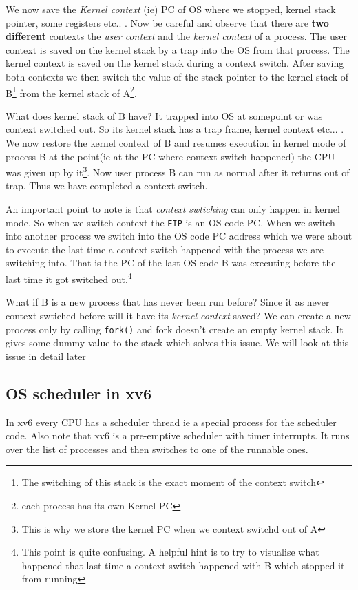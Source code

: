 \documentclass[12pt]{article}
\begin{document}
 We now save the \textit{Kernel context} (ie) PC of OS where we stopped, kernel stack pointer, some registers etc.. . Now be careful and observe that there are \textbf{two different} contexts the \textit{user context} and the \textit{kernel context} of a process.
 The user context is saved on the kernel stack by a trap into the OS from that process. The kernel context is saved on the kernel stack during a context switch.
 After saving both contexts we then switch the value of the stack pointer to the kernel stack of B\footnote{The switching of this stack is the exact moment of the context switch} from the kernel stack of A\footnote{each process has its own Kernel PC}. 

 What does kernel stack of B have? It trapped into OS at somepoint or was context switched out. So its kernel stack has a trap frame, kernel context etc... . We now restore the kernel context
 of B and resumes execution in kernel mode of process B at the point(ie at the PC where context switch happened) the CPU was given up by it\footnote{This is why we store the kernel PC when we context switchd out of A}. Now user process B can run as normal after it returns out of trap.
 Thus we have completed a context switch. 
 
 
 An important point to note is that \textit{context swtiching }can only happen in kernel mode. So when we switch context the \texttt{EIP} is an OS code PC. When we switch into another process we switch into the OS code PC 
 address which we were about to execute the last time a context switch happened with the process we are switching into. That is the PC of the last OS code B was executing before the last time it got switched out.\footnote{This point is quite confusing. A helpful hint is to try to visualise what happened that last time a context switch happened with B which stopped it from running}

 What if B is a new process that has never been run before? Since it as never context swtiched before will it have its \textit{kernel context} saved? We can create a new process only by calling
 \texttt{fork()} and fork doesn't create an empty kernel stack. It gives some dummy value to the stack which solves this issue. We will look at this issue in detail later

 \subsection{OS scheduler in xv6}
 In xv6 every CPU has a scheduler thread ie a special process for the scheduler code. Also note that xv6 is a pre-emptive scheduler with timer interrupts. It runs over the list of processes and then switches to one of the runnable ones. 
\end{document}
